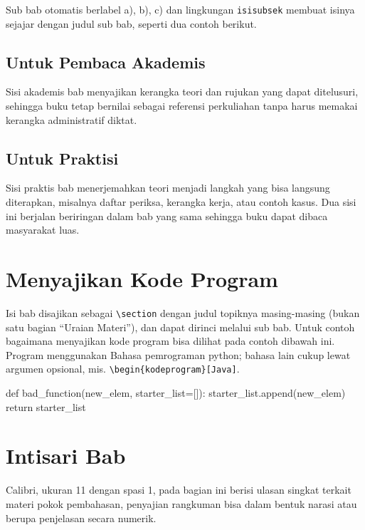 \documentclass{bukupedia}
\begin{document}
Sub bab otomatis berlabel a), b), c) dan lingkungan \verb|isisubsek|
membuat isinya sejajar dengan judul sub bab, seperti dua contoh berikut.

\subsection{Untuk Pembaca Akademis}
\begin{isisubsek}
Sisi akademis bab menyajikan kerangka teori dan rujukan yang dapat
ditelusuri, sehingga buku tetap bernilai sebagai referensi perkuliahan
tanpa harus memakai kerangka administratif diktat.
\end{isisubsek}

\subsection{Untuk Praktisi}
\begin{isisubsek}
Sisi praktis bab menerjemahkan teori menjadi langkah yang bisa langsung
diterapkan, misalnya daftar periksa, kerangka kerja, atau contoh kasus.
Dua sisi ini berjalan beriringan dalam bab yang sama sehingga buku dapat
dibaca masyarakat luas.
\end{isisubsek}

\section{Menyajikan Kode Program}
Isi bab disajikan sebagai \verb|\section| dengan judul topiknya
masing-masing (bukan satu bagian ``Uraian Materi''), dan dapat dirinci
melalui sub bab. Untuk contoh bagaimana menyajikan kode program bisa
dilihat pada contoh dibawah ini. Program menggunakan Bahasa pemrograman
python; bahasa lain cukup lewat argumen opsional, mis.
\verb|\begin{kodeprogram}[Java]|.

\begin{kodeprogram}
def bad_function(new_elem, starter_list=[]):
    starter_list.append(new_elem)
    return starter_list
\end{kodeprogram}

\section{Intisari Bab}
Calibri, ukuran 11 dengan spasi 1, pada bagian ini berisi ulasan singkat
terkait materi pokok pembahasan, penyajian rangkuman bisa dalam bentuk
narasi atau berupa penjelasan secara numerik.
\end{document}
